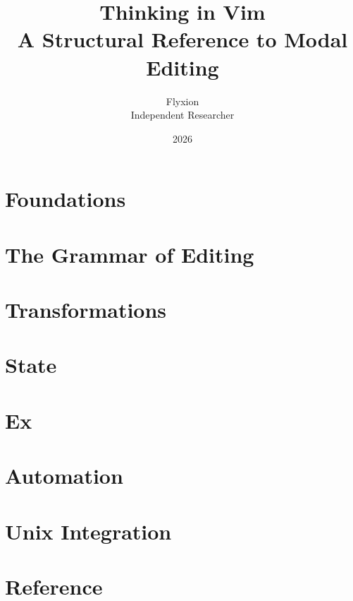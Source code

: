 \documentclass[11pt]{book}
\title{\Huge Thinking in Vim\\[0.3em]\Large A Structural Reference to Modal Editing}
\author{Flyxion\\[0.2em]\normalsize Independent Researcher}
\date{2026}
\begin{document}
\frontmatter

\maketitle



\tableofcontents

\mainmatter

\part{Foundations}




\part{The Grammar of Editing}




\part{Transformations}




\part{State}




\part{Ex}




\part{Automation}



\part{Unix Integration}




\part{Reference}


\appendix










\end{document}

